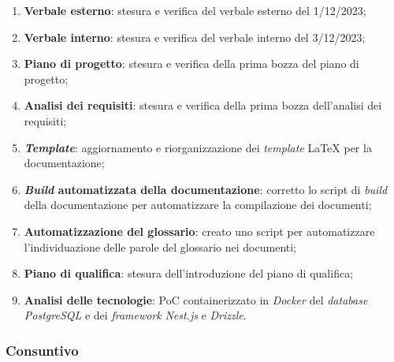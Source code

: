 \begin{enumerate}
	\item \textbf{Verbale esterno}: stesura e verifica del verbale esterno del
	      1/12/2023;

	\item \textbf{Verbale interno}: stesura e verifica del verbale interno del
	      3/12/2023;

	\item \textbf{Piano di progetto}: stesura e verifica della prima bozza del
	      piano di progetto;

	\item \textbf{Analisi dei requisiti}: stesura e verifica della prima bozza
	      dell'analisi dei requisiti;

	\item \textbf{\textit{Template}}: aggiornamento e riorganizzazione dei
	      \textit{template} \LaTeX{} per la documentazione;

	\item \textbf{\textit{Build} automatizzata della documentazione}:
	      corretto lo script di \textit{build} della documentazione per
	      automatizzare la compilazione dei documenti;

	\item \textbf{Automatizzazione del glossario}: creato uno script per
	      automatizzare l'individuazione delle parole del glossario nei
	      documenti;

	\item \textbf{Piano di qualifica}: stesura dell'introduzione del piano
	      di qualifica;

	\item \textbf{Analisi delle tecnologie}: PoC containerizzato in
	      \textit{Docker} del \textit{database} \textit{PostgreSQL} e dei
	      \textit{framework} \textit{Nest.js} e \textit{Drizzle}.
\end{enumerate}

\subsubsection{Consuntivo}

